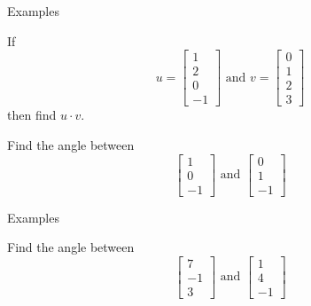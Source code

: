 \documentclass{beamer}
\begin{document}
\begin{frame}{Examples}
  \begin{example}
    If \begin{equation*}
      u=\left[
	\begin{array}{c}
          1\\
          2\\
          0\\
          -1
	\end{array}
      \right]\text{ and }
      v = \left[
	\begin{array}{c}
          0\\
          1\\
          2\\
          3
	\end{array}
      \right]
    \end{equation*}
    then find $u\cdot v$.
  \end{example}
  \begin{example}
    Find the angle between
    \begin{equation*}
      \left[
	\begin{array}{c}
          1\\
          0\\
          -1
	\end{array}
      \right]\text{ and } \left[
	\begin{array}{c}
          0\\
          1\\
          -1
	\end{array}
      \right]
    \end{equation*}
  \end{example}
\end{frame}

\begin{frame}{Examples}
  \begin{example}
    Find the angle between
    \begin{equation*}
      \left[
	\begin{array}{c}
          7\\
          -1\\
          3
	\end{array}
      \right]\text{ and } \left[
	\begin{array}{c}
          1\\
          4\\
          -1
	\end{array}
      \right]
    \end{equation*}
  \end{example}
\end{frame}
\end{document}
